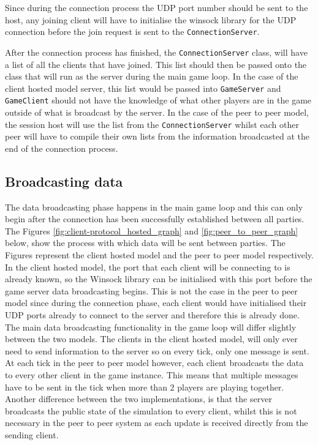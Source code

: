 Since during the connection process the UDP port number should be sent to the host, any joining client will have to initialise the winsock library for the UDP connection before the join request is sent to the \lstinline{ConnectionServer}.

After the connection process has finished, the \lstinline{ConnectionServer} class, will have a list of all the clients that have joined. This list should then be passed onto the class that will run as the server during the main game loop. In the case of the client hosted model server, this list would be passed into \lstinline{GameServer} and \lstinline{GameClient} should not have the knowledge of what other players are in the game outside of what is broadcast by the server. In the case of the peer to peer model, the session host will use the list from the \lstinline{ConnectionServer} whilst each other peer will have to compile their own lists from the information broadcasted at the end of the connection process.



\newpage


\subsection{Broadcasting data}
The data broadcasting phase happens in the main game loop and this can only begin after the connection has been successfully established between all parties. The Figures \ref{fig:client-protocol_hosted_graph} and \ref{fig:peer_to_peer_graph} below, show the process with which data will be sent between parties. The Figures represent the client hosted model and the peer to peer model respectively.
In the client hosted model, the port that each client will be connecting to is already known, so the Winsock library can be initialised with this port before the game server data broadcasting begins. This is not the case in the peer to peer model since during the connection phase, each client would have initialised their UDP ports already to connect to the server and therefore this is already done. The main data broadcasting functionality in the game loop will differ slightly between the two models. The clients in the client hosted model, will only ever need to send information to the server so on every tick, only one message is sent. At each tick in the peer to peer model however, each client broadcasts the data to every other client in the game instance. This means that multiple messages have to be sent in the tick when more than 2 players are playing together.
Another difference between the two implementations, is that the server broadcasts the public state of the simulation to every client, whilst this is not necessary in the peer to peer system as each update is received directly from the sending client.

